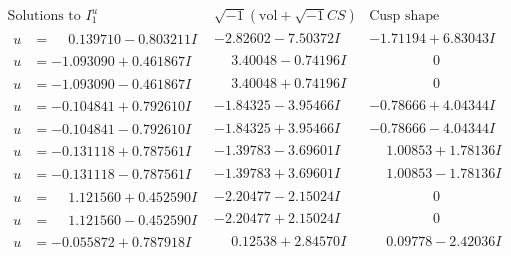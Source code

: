 \documentclass[1p]{elsarticle_modified}
\theoremstyle{definition}
\newcommand{\I}{\sqrt{-1}}
\begin{document}
$$\begin{array}{c|c|c}
\text{Solutions to }I^u_{1}& \I (\text{vol} + \sqrt{-1}CS) & \text{Cusp shape}\\
 \hline 
\begin{aligned}
u &= \phantom{-}0.139710 - 0.803211 I\end{aligned}
 & -2.82602 - 7.50372 I & -1.71194 + 6.83043 I \\ \hline\begin{aligned}
u &= -1.093090 + 0.461867 I\end{aligned}
 & \phantom{-}3.40048 - 0.74196 I & \phantom{-0.000000 } 0 \\ \hline\begin{aligned}
u &= -1.093090 - 0.461867 I\end{aligned}
 & \phantom{-}3.40048 + 0.74196 I & \phantom{-0.000000 } 0 \\ \hline\begin{aligned}
u &= -0.104841 + 0.792610 I\end{aligned}
 & -1.84325 - 3.95466 I & -0.78666 + 4.04344 I \\ \hline\begin{aligned}
u &= -0.104841 - 0.792610 I\end{aligned}
 & -1.84325 + 3.95466 I & -0.78666 - 4.04344 I \\ \hline\begin{aligned}
u &= -0.131118 + 0.787561 I\end{aligned}
 & -1.39783 - 3.69601 I & \phantom{-}1.00853 + 1.78136 I \\ \hline\begin{aligned}
u &= -0.131118 - 0.787561 I\end{aligned}
 & -1.39783 + 3.69601 I & \phantom{-}1.00853 - 1.78136 I \\ \hline\begin{aligned}
u &= \phantom{-}1.121560 + 0.452590 I\end{aligned}
 & -2.20477 - 2.15024 I & \phantom{-0.000000 } 0 \\ \hline\begin{aligned}
u &= \phantom{-}1.121560 - 0.452590 I\end{aligned}
 & -2.20477 + 2.15024 I & \phantom{-0.000000 } 0 \\ \hline\begin{aligned}
u &= -0.055872 + 0.787918 I\end{aligned}
 & \phantom{-}0.12538 + 2.84570 I & \phantom{-}0.09778 - 2.42036 I \\ \hline\begin{aligned}

\end{aligned}
\end{array}$$
\end{document}
